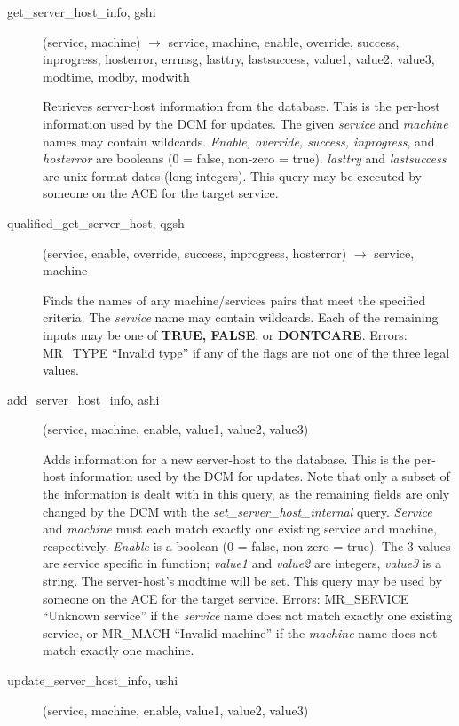 \begin{description}
\item[get\_server\_host\_info, gshi](service, machine) $\rightarrow$ service,
machine, enable, override, success, inprogress, hosterror, errmsg,
lasttry, lastsuccess, value1, value2, value3, modtime, modby, modwith

Retrieves server-host information from the database.  This is the
per-host information used by the DCM for updates.  The given
{\em service} and {\em machine} names may contain wildcards.  {\em Enable,
override, success, inprogress}, and {\em hosterror} are booleans (0 =
false, non-zero = true).  {\em lasttry} and {\em lastsuccess} are unix
format dates (long integers).  This query may be executed by someone
on the ACE for the target service.

\item[qualified\_get\_server\_host, qgsh](service, enable, override, success,
inprogress, hosterror) $\rightarrow$ service, machine

Finds the names of any machine/services pairs that meet the specified
criteria.  The {\em service} name may contain wildcards.  Each of the
remaining inputs may be one of {\bf TRUE, FALSE}, or {\bf DONTCARE}.
Errors: MR\_TYPE ``Invalid type'' if any of the flags are not one of the
three legal values.

\item[add\_server\_host\_info, ashi](service, machine, enable, value1, value2,
value3)

Adds information for a new server-host to the database.  This is the
per-host information used by the DCM for updates.  Note that only a
subset of the information is dealt with in this query, as the
remaining fields are only changed by the DCM with the
{\em set\_server\_host\_internal} query.  {\em Service} and {\em machine} must
each match exactly one existing service and machine, respectively.
{\em Enable} is a boolean (0 = false, non-zero = true).  The 3 values
are service specific in function; {\em value1} and {\em value2} are
integers, {\em value3} is a string.  The server-host's modtime will be
set.  This query may be used by someone on the ACE for the target
service.  Errors: MR\_SERVICE ``Unknown service'' if the {\em service}
name does not match exactly one existing service, or MR\_MACH ``Invalid
machine'' if the {\em machine} name does not match exactly one machine.

\item[update\_server\_host\_info, ushi](service, machine, enable, value1,
value2, value3)


\end{description}
